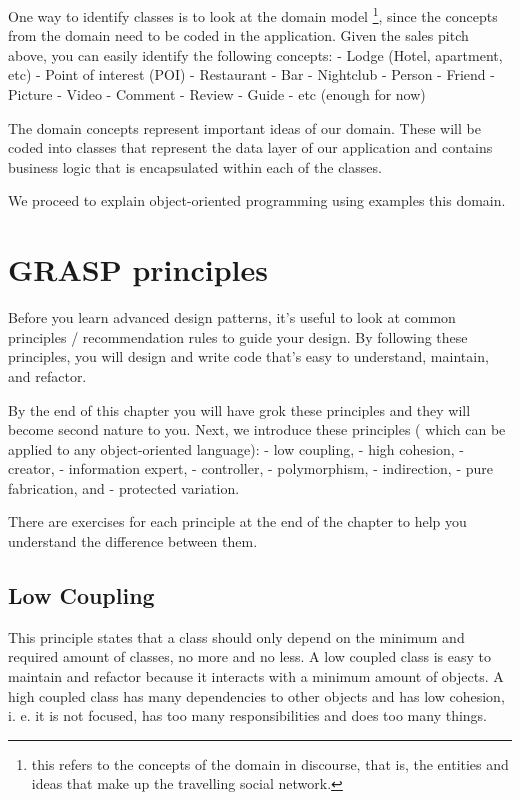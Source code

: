 \documentclass[]{article}
\let\rmarkdownfootnote\footnote%
\def\footnote{\protect\rmarkdownfootnote}
\begin{document}
One way to identify classes is to look at the domain model \footnote{this
  refers to the concepts of the domain in discourse, that is, the
  entities and ideas that make up the travelling social network.}, since
the concepts from the domain need to be coded in the application. Given
the sales pitch above, you can easily identify the following concepts: -
Lodge (Hotel, apartment, etc) - Point of interest (POI) - Restaurant -
Bar - Nightclub - Person - Friend - Picture - Video - Comment - Review -
Guide - etc (enough for now)

The domain concepts represent important ideas of our domain. These will
be coded into classes that represent the data layer of our application
and contains business logic that is encapsulated within each of the
classes.

We proceed to explain object-oriented programming using examples this
domain.

\section{GRASP principles}\label{grasp-principles}

Before you learn advanced design patterns, it's useful to look at common
principles / recommendation rules to guide your design. By following
these principles, you will design and write code that's easy to
understand, maintain, and refactor.

By the end of this chapter you will have grok these principles and they
will become second nature to you. Next, we introduce these principles (
which can be applied to any object-oriented language): - low coupling, -
high cohesion, - creator, - information expert, - controller, -
polymorphism, - indirection, - pure fabrication, and - protected
variation.

There are exercises for each principle at the end of the chapter to help
you understand the difference between them.

\subsection{Low Coupling}\label{low-coupling}

This principle states that a class should only depend on the minimum and
required amount of classes, no more and no less. A low coupled class is
easy to maintain and refactor because it interacts with a minimum amount
of objects. A high coupled class has many dependencies to other objects
and has low cohesion, i. e. it is not focused, has too many
responsibilities and does too many things.
\end{document}
